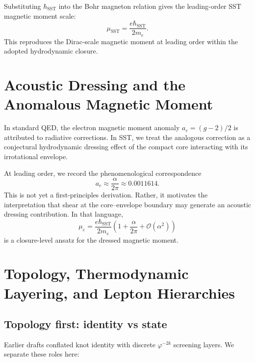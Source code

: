 \documentclass[11pt]{article}
\begin{document}
    Substituting \(\hbar_{\text{SST}}\) into the Bohr magneton relation gives the leading-order SST magnetic moment scale:
    \begin{equation}
        \mu_{\text{SST}} = \frac{e \hbar_{\text{SST}}}{2 m_e}.
    \end{equation}
    This reproduces the Dirac-scale magnetic moment at leading order within the adopted hydrodynamic closure.

    \section{Acoustic Dressing and the Anomalous Magnetic Moment}
    \label{sec:g_factor}
    
    In standard QED, the electron magnetic moment anomaly \(a_e=(g-2)/2\) is attributed to radiative corrections. In SST, we treat the analogous correction as a conjectural hydrodynamic dressing effect of the compact core interacting with its irrotational envelope.
    
    At leading order, we record the phenomenological correspondence
    \begin{equation}
        a_e \approx \frac{\alpha}{2\pi} \approx 0.0011614.
    \end{equation}
    This is not yet a first-principles derivation. Rather, it motivates the interpretation that shear at the core--envelope boundary may generate an acoustic dressing contribution. In that language,
    \begin{equation}
        \mu_e = \frac{e \hbar_{\text{SST}}}{2 m_e}
        \left(1+\frac{\alpha}{2\pi}+\mathcal{O}(\alpha^2)\right)
    \end{equation}
    is a closure-level ansatz for the dressed magnetic moment.

    \section{Topology, Thermodynamic Layering, and Lepton Hierarchies}
    \label{sec:topology_layers}
    
    \subsection{Topology first: identity vs state}
        Earlier drafts conflated knot identity with discrete \(\varphi^{-2k}\) screening layers. We separate these roles here:
        
\end{document}
